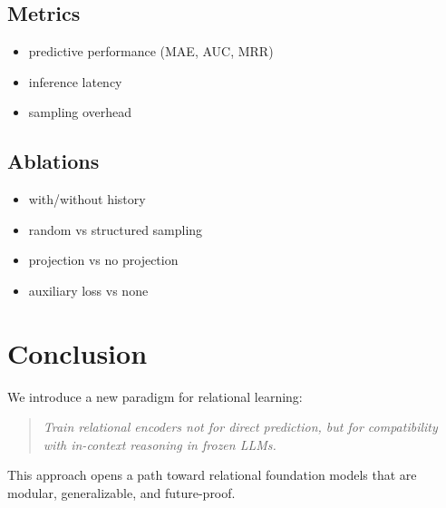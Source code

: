 \documentclass[11pt]{article}
\begin{document}
\subsection{Metrics}
\begin{itemize}
\item predictive performance (MAE, AUC, MRR)
\item inference latency
\item sampling overhead
\end{itemize}

\subsection{Ablations}
\begin{itemize}
\item with/without history
\item random vs structured sampling
\item projection vs no projection
\item auxiliary loss vs none
\end{itemize}

\section{Conclusion}

We introduce a new paradigm for relational learning:

\begin{quote}
\textit{Train relational encoders not for direct prediction, but for compatibility with in-context reasoning in frozen LLMs.}
\end{quote}

This approach opens a path toward relational foundation models that are modular, generalizable, and future-proof.



\end{document}
